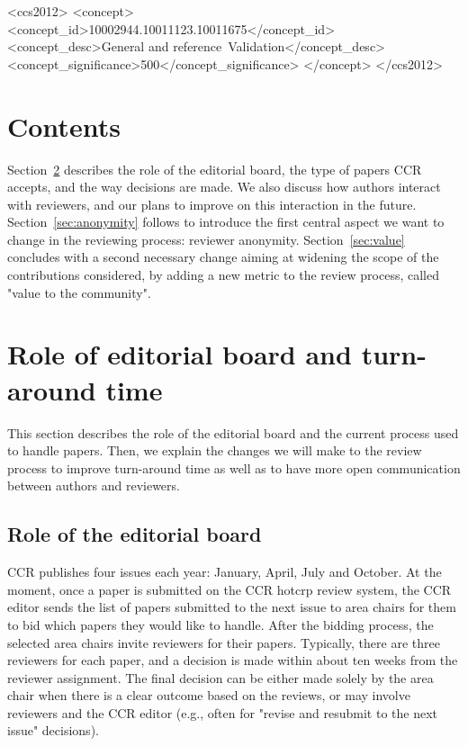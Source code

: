 \documentclass[sigconf]{acmart}
\begin{document}
    \begin{CCSXML}
	<ccs2012>
	<concept>
	<concept_id>10002944.10011123.10011675</concept_id>
	<concept_desc>General and reference~Validation</concept_desc>
	<concept_significance>500</concept_significance>
	</concept>
	</ccs2012>
\end{CCSXML}

        
    
    
    \maketitle

    \section{Contents}\label{sec:content}

Section~\ref{sec:board-time} describes the role of the editorial board, the type of papers CCR accepts, and the way decisions are made. We also discuss how authors interact with reviewers, and our plans to improve on this interaction in the future. Section~\ref{sec:anonymity} follows to introduce the first central aspect we want to change in the reviewing process: reviewer anonymity.  Section~\ref{sec:value} concludes with a second necessary change aiming at widening the scope of the contributions considered, by adding a new metric to the review process, called "value to the community".

\section{Role of editorial board and turn-around time}
\label{sec:board-time}
    
This section describes the role of the editorial board and the current process used to handle papers. Then, we explain the changes we will make to the review process to improve turn-around time as well as to have more open communication between authors and reviewers.

 \subsection{Role of the editorial board}
\label{subsec:board}

CCR publishes four issues each year: January, April, July and October.
At the moment, once a paper is submitted on the CCR hotcrp review system, the CCR editor sends the list of papers submitted to the next issue to area chairs for them to bid which papers they would like to handle. After the bidding process, the selected area chairs invite reviewers for their papers. Typically,  there are three reviewers for each paper, and a decision is made within about ten weeks from the reviewer assignment. The final decision can be either made solely by the area chair when there is a clear outcome based on the reviews, or may involve reviewers and the CCR editor (e.g., often for "revise and resubmit to the next issue" decisions). 
\end{document}
